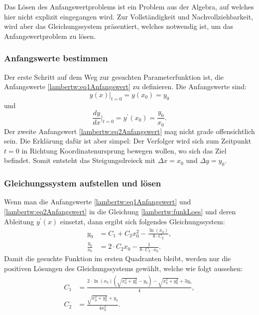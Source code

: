 Das Lösen des Anfangswertproblems ist ein Problem aus der Algebra, auf welches hier nicht explizit eingegangen wird. Zur Vollständigkeit und Nachvollziehbarkeit, wird aber das Gleichungssystem präsentiert, welches notwendig ist, um das Anfangswertproblem zu lösen.

\subsubsection{Anfangswerte bestimmen
	\label{lambertw:subsubsection:Anfangswerte}}
Der erste Schritt auf dem Weg zur gesuchten Parameterfunktion ist, die Anfangswerte \eqref{lambertw:eq1Anfangswert} zu definieren.
Die Anfangswerte sind:
\begin{equation}
	y(x)\big \vert_{t=0}
	=
	y(x_0)
	= 
	y_0
	\label{lambertw:eq1Anfangswert}
\end{equation}
und
\begin{equation}
	\frac{dy}{dx}\bigg \vert_{t=0}
	=
	y^{\prime}(x_0)
	=
	\frac{y_0}{x_0}.
	\label{lambertw:eq2Anfangswert}
\end{equation}
Der zweite Anfangswert \eqref{lambertw:eq2Anfangswert} mag nicht grade offensichtlich sein. Die Erklärung dafür ist aber simpel: Der Verfolger wird sich zum Zeitpunkt \(t=0\) in Richtung Koordinatenursprung bewegen wollen, wo sich das Ziel befindet. Somit entsteht das Steigungsdreieck mit \(\Delta x = x_0\) und \(\Delta y = y_0\).

\subsubsection{Gleichungssystem aufstellen und lösen
	\label{lambertw:subsubsection:GlSys}}
Wenn man die Anfangswerte \eqref{lambertw:eq1Anfangswert} und \eqref{lambertw:eq2Anfangswert} in die Gleichung \eqref{lambertw:funkLoes} und deren Ableitung \(y^{\prime}(x)\) einsetzt, dann ergibt sich folgendes Gleichungssystem:
\begin{subequations}
	\begin{align}
		y_0
		&=
		C_1 + C_2 x^2_0 - \frac{\operatorname{ln}(x_0)}{8 \cdot C_2}, \\
		\frac{y_0}{x_0}
		&=
		2 \cdot  C_2 x_0 - \frac{1}{8 \cdot C_2 \cdot x_0}.
	\end{align}
	\label{lambertw:eqGleichungssystem}
\end{subequations}
Damit die gesuchte Funktion im ersten Quadranten bleibt, werden nur die positiven Lösungen des Gleichungssystems gewählt, welche wie folgt aussehen:
\begin{subequations}
	\begin{align}
		\label{lambertw:eqKoeff1}
		C_1
		&=
		\frac{2\cdot\operatorname{ln}(x_0)\left(\sqrt{x_0^2 + y_0^2} - y_0 \right) - \sqrt{x_0^2 + y_0^2} + 3 y_0}{4}, \\
		\label{lambertw:eqKoeff2}
		C_2
		&=
		\frac{\sqrt{x_0^2 + y_0^2} + y_0}{4x_0^2}.
	\end{align}
\end{subequations}
